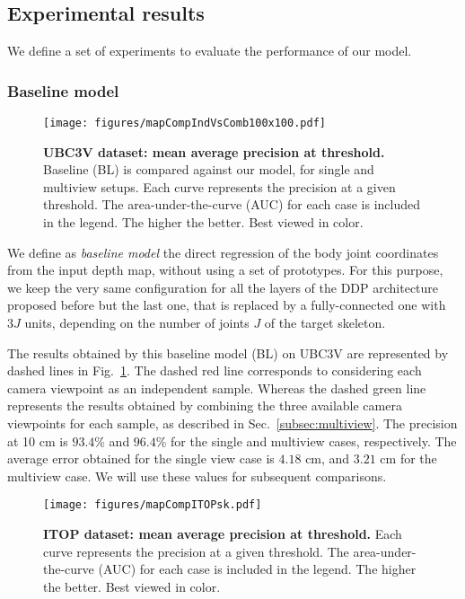\documentclass[review,12pt,3p]{elsarticle}
\begin{document}
\subsection{Experimental results} \label{subsec:compstudy}
We define a set of experiments to evaluate the performance of our model.

\subsubsection{Baseline model}
\begin{figure}[t]
\centering
  \texttt{[image: figures/mapCompIndVsComb100x100.pdf]}
  \caption{\textbf{UBC3V dataset: mean average precision at threshold.} Baseline (BL) is compared against our model, for single and multiview setups. Each curve represents the precision at a given threshold. The area-under-the-curve (AUC) for each case is included in the legend. The higher the better. Best viewed in color.}
  \label{fig:singleVSmulti}
\end{figure}
We define as \textit{baseline model} the direct regression of the body joint coordinates from the input depth map, without using a set of prototypes. For this purpose, we keep the very same configuration for all the layers of the DDP architecture proposed before but the last one, that is replaced by a fully-connected one with $3J$ units, depending on the number of joints $J$ of the target skeleton.

The results obtained by this baseline model (BL) on UBC3V are represented by dashed lines in Fig.~\ref{fig:singleVSmulti}. The dashed red line corresponds to considering each camera viewpoint as an independent sample. Whereas the dashed green line represents the results obtained by combining the three available camera viewpoints for each sample, as described in Sec.~\ref{subsec:multiview}.
The precision at 10 cm is $93.4$\% and $96.4$\% for the single and multiview cases, respectively.
The average error obtained for the single view case is $4.18$ cm, and $3.21$ cm for the multiview case. 
We will use these values for subsequent comparisons.

\begin{figure}[t]
\centering
  \texttt{[image: figures/mapCompITOPsk.pdf]}
  \caption{\textbf{ITOP dataset: mean average precision at threshold.} Each curve represents the precision at a given threshold. The area-under-the-curve (AUC) for each case is included in the legend. The higher the better. Best viewed in color.}
  \label{fig:curveITOP}
\end{figure}
\end{document}
